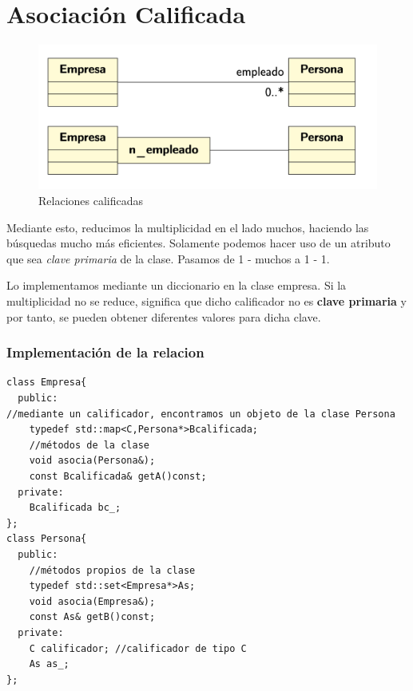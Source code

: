 \chapter{Asociación Calificada}
\begin{figure}[h]
\vspace{-.5cm}
	\centering
	\includegraphics[width=\textwidth]{Imagenes/asc.png}
	\caption{Relaciones calificadas}
\end{figure}
Mediante esto, reducimos la multiplicidad en el lado muchos, haciendo las búsquedas mucho más eficientes.
Solamente podemos hacer uso de un atributo que sea \textit{clave primaria} de la clase.
Pasamos de 1 - muchos a 1 - 1.

Lo implementamos mediante un diccionario en la clase empresa.
Si la multiplicidad no se reduce, significa que dicho calificador no es \textbf{clave primaria} y por tanto, se pueden obtener diferentes valores para dicha clave.
\subsection{Implementación de la relacion}
\begin{center}
	\begin{lstlisting}[frame=single]
class Empresa{
  public:
//mediante un calificador, encontramos un objeto de la clase Persona
    typedef std::map<C,Persona*>Bcalificada; 
    //métodos de la clase
    void asocia(Persona&);
    const Bcalificada& getA()const;
  private:
    Bcalificada bc_;
};
class Persona{
  public:
    //métodos propios de la clase
    typedef std::set<Empresa*>As;
    void asocia(Empresa&);
    const As& getB()const;
  private:
    C calificador; //calificador de tipo C
    As as_;
};
\end{lstlisting}
\end{center}